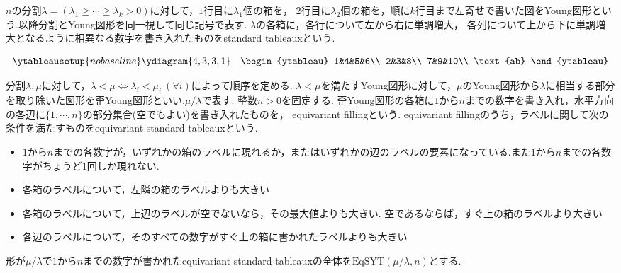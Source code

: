 \begin{defin}
  $n$の分割$\lambda=(\lambda_1\geq\cdots\geq\lambda_k>0)$に対して，$1$行目に$\lambda_1$個の箱を， $2$行目に$\lambda_2$個の箱を，順に$k$行目まで左寄せで書いた図をYoung図形という.以降分割とYoung図形を同一視して同じ記号で表す. $\lambda$の各箱に，各行について左から右に単調増大， 各列について上から下に単調増大となるように相異なる数字を書き入れたものをstandard tableauxという. 

\[
\ytableausetup{nobaseline}
\ydiagram{4, 3, 3, 1}
\quad\begin{ytableau}
    1&4&5&6\\
    2&3&8\\
    7&9&10\\
    \text{ab}
\end{ytableau}
\]

\end{defin}

\begin{defin}
  分割$\lambda, \mu$に対して，$\lambda<\mu\Leftrightarrow \lambda_i<\mu_i\:(\forall i)$によって順序を定める. $\lambda<\mu$を満たすYoung図形に対して，$\mu$のYoung図形から$\lambda$に相当する部分を取り除いた図形を歪Young図形といい.$\mu/\lambda$で表す. 整数$n>0$を固定する. 歪Young図形の各箱に$1$から$n$までの数字を書き入れ，水平方向の各辺に$\{1,\cdots,n\}$の部分集合(空でもよい)を書き入れたものを， equivariant fillingという. equivariant fillingのうち，ラベルに関して次の条件を満たすものをequivariant standard tableauxという.
  \begin{itemize}
    \item $1$から$n$までの各数字が，いずれかの箱のラベルに現れるか，またはいずれかの辺のラベルの要素になっている.また$1$から$n$までの各数字がちょうど1回しか現れない.
    \item 各箱のラベルについて，左隣の箱のラベルよりも大きい
    \item 各箱のラベルについて，上辺のラベルが空でないなら，その最大値よりも大きい. 空であるならば，すぐ上の箱のラベルより大きい
    \item 各辺のラベルについて，そのすべての数字がすぐ上の箱に書かれたラベルよりも大きい
  \end{itemize}
  形が$\mu/\lambda$で$1$から$n$までの数字が書かれたequivariant standard tableauxの全体を$\text{EqSYT}(\mu/\lambda, n)$とする.
\end{defin}

